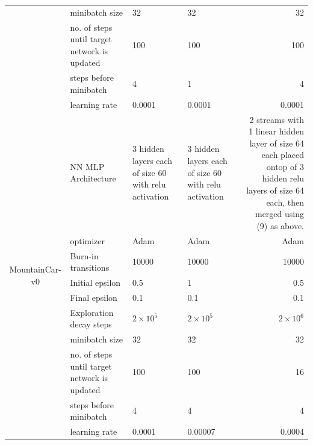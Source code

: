 \documentclass[12pt]{article}
\begin{document}
\begin{tcolorbox}[fit,height=22cm, width=\textwidth, blank, borderline={1pt}{-2pt},nobeforeafter]
\begin{table}[H]
\begin{tabular}{|c|p{7.785em}|l|l|r|}
			\cline{2-5}          & minibatch size & 32    & 32    & 32  \\
			\cline{2-5}          & no. of steps until target network is updated & 100   & 100   & 100  \\
			\cline{2-5}          & steps before minibatch & 4     & 1     & 4 \\
			\cline{2-5}          & learning rate & 0.0001 & 0.0001 &  0.0001 \\
			\hline
			\multirow{10}[20]{*}{\begin{sideways}MountainCar-v0\end{sideways}} & NN MLP Architecture  & \multicolumn{1}{p{7.93em}|}{3 hidden layers each of size 60 with relu activation} & \multicolumn{1}{p{7.93em}|}{3 hidden layers each of size 60 with relu activation} & \multicolumn{1}{p{7.93em}|}{2 streams with 1 linear hidden layer of size 64 each placed ontop of 3 hidden relu layers of size 64 each, then merged using (9) as above.} \\
			\cline{2-5}          & optimizer & \multicolumn{1}{p{7.93em}|}{Adam} & \multicolumn{1}{p{7.93em}|}{Adam} & \multicolumn{1}{p{7.93em}|}{Adam} \\
			\cline{2-5}          & Burn-in transitions & 10000 & 10000 & 10000 \\
			\cline{2-5}          & Initial epsilon & 0.5   & 1     & 0.5  \\
			\cline{2-5}          & Final epsilon & 0.1   & 0.1   &  0.1 \\
			\cline{2-5}          & Exploration decay steps & \multicolumn{1}{p{7.93em}|}{$2\times10^5$} & \multicolumn{1}{p{7.93em}|}{$2\times10^5$} & \multicolumn{1}{p{7.93em}|}{$2\times10^6$} \\
			\cline{2-5}          & minibatch size & 32    & 32    & 32 \\
			\cline{2-5}          & no. of steps until target network is updated & 100   & 100   & 16 \\
			\cline{2-5}          & steps before minibatch & 4     & 4     & 4 \\
			\cline{2-5}          & learning rate & 0.0001 & 0.00007 & 0.0004 \\
			\hline
		\end{tabular}%
		\label{tab1}%
	\end{table}%
     
    \end{tcolorbox}
\end{document}
